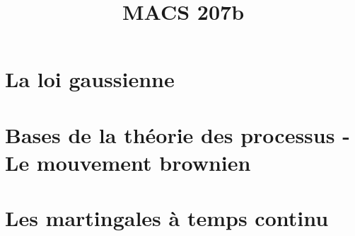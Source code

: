 \documentclass[a4paper,10pt]{article}
\title{\vspace{-1.2cm} \textbf{MACS 207b}}
\begin{document}
\maketitle

\vspace{-1.5cm}

\section{La loi gaussienne}
	

\section{Bases de la théorie des processus - Le mouvement brownien}
	

\section{Les martingales à temps continu}
	
\end{document}
